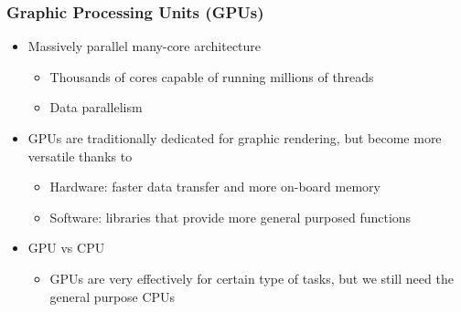 \documentclass[10pt,t]{beamer}
\begin{document}
\begin{frame}
  \frametitle{Graphic Processing Units (GPUs)}
  \begin{itemize}
  \item Massively parallel many-core architecture
    \begin{itemize}
    \item Thousands of cores capable of running millions of threads
    \item Data parallelism
    \end{itemize}
  \item GPUs are traditionally dedicated for graphic rendering, but
    become more versatile thanks to
    \begin{itemize}
    \item Hardware: faster data transfer and more on-board memory
    \item Software: libraries that provide more general purposed
      functions
    \end{itemize}
  \item GPU vs CPU
    \begin{itemize}
    \item GPUs are very effectively for certain type of tasks, but we still need the general purpose CPUs
    \end{itemize}
  \end{itemize}
\end{frame}
\end{document}
